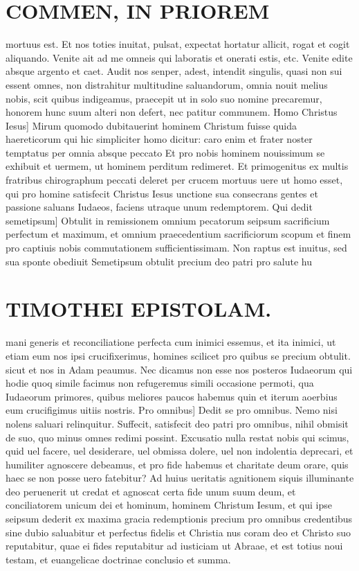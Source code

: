 \documentclass{article}
\begin{document}
\begin{pages}
\section*{COMMEN, IN PRIOREM }
\marginpar{[ p.50 ]}\pstart mortuus est. Et nos toties inuitat, pulsat, expectat hortatur allicit, rogat et cogit aliquando. Venite ait ad me omneis qui laboratis et onerati estis, etc. Venite edite absque argento et caet. Audit nos senper, adest, intendit singulis, quasi non sui essent omnes, non distrahitur multitudine saluandorum, omnia nouit melius nobis, scit quibus indigeamus, praecepit ut in solo suo nomine precaremur, honorem hunc suum alteri non defert, nec patitur communem.  \pend\pstart Homo Christus Iesus] Mirum quomodo dubitauerint hominem Christum fuisse quida haereticorum qui hic simpliciter homo dicitur: caro enim et frater noster temptatus per omnia absque  peccato Et pro nobis hominem nouissimum se exhibuit et uermem, ut hominem perditum redimeret. Et primogenitus ex multis fratribus chirographum peccati deleret per crucem mortuus uere ut homo esset, qui pro homine satisfecit Christus Iesus unctione sua consecrans gentes et passione saluans Iudaeos, faciens utraque  unum redemptorem.  \pend\pstart Qui dedit semetipsum] Obtulit in remissionem omnium pecatorum seipsum sacrificium perfectum et maximum, et omnium praecedentium sacrificiorum scopum et finem pro captiuis nobis commutationem sufficientissimam. Non raptus est inuitus, sed sua sponte obediuit Semetipsum obtulit precium deo patri pro salute hu\pend
\section*{TIMOTHEI EPISTOLAM. }
\marginpar{[ p.51 ]}\pstart mani generis et reconciliatione perfecta cum inimici essemus, et ita inimici, ut etiam eum nos ipsi crucifixerimus, homines scilicet pro quibus se precium obtulit. sicut et nos in Adam peaumus. Nec dicamus non esse nos posteros Iudaeorum qui hodie quoq simile facimus non refugeremus simili occasione permoti, qua Iudaeorum primores, quibus meliores paucos habemus quin et iterum aoerbius eum crucifigimus uitiis nostris.  \pend\pstart Pro omnibus] Dedit se pro omnibus. Nemo nisi nolens saluari relinquitur. Suffecit, satisfecit deo patri pro omnibus, nihil obmisit de suo, quo minus omnes redimi possint. Excusatio nulla restat nobis qui scimus, quid uel facere, uel desiderare, uel obmissa dolere, uel non indolentia deprecari, et humiliter agnoscere debeamus, et pro fide habemus et charitate deum orare, quis haec se non posse uero fatebitur? Ad huius ueritatis agnitionem siquis illuminante deo peruenerit ut credat et agnoscat certa fide unum suum deum, et conciliatorem unicum dei et hominum, hominem Christum Iesum, et qui ipse seipsum dederit ex maxima gracia redemptionis precium pro omnibus credentibus sine dubio saluabitur et perfectus fidelis et Christia nus coram deo et Christo suo reputabitur, quae ei fides reputabitur ad iusticiam ut Abraae, et est totius noui testam, et euangelicae doctrinae conclusio et summa.  \pend

\end{pages}
\end{document}

